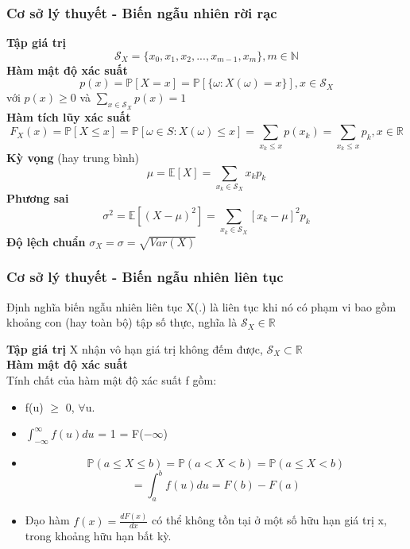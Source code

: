 \documentclass{beamer}
\begin{document}

\begin{frame}[t]
\frametitle{Cơ sở lý thuyết - Biến ngẫu nhiên rời rạc}
\textbf{Tập giá trị} 
\[
\mathcal{S}_X = \{x_0, x_1, x_2, ..., x_{m-1}, x_m\}, m \in \mathbb{N}
\]
\textbf{Hàm mật độ xác suất}\\
\[
p(x) = \mathbb{P}[X=x]= \mathbb{P}[\{\omega: X(\omega)=x\}], x \in \mathcal{S}_X
\]
với $p(x) \geq 0$ và $\sum_{x \in \mathcal{S}_X} p(x) = 1$\\
\textbf{Hàm tích lũy xác suất}
\[
F_{X}(x) = \mathbb{P}[X\leq x] = \mathbb{P}[{\omega \in S: X(\omega) \leq x}]=\sum_{x_k\leq x} p(x_k)
 = \sum_{x_k\leq x} p_k,   x \in \mathbb{R}
\] 
\textbf{Kỳ vọng} (hay trung bình)
\[
\mu = \mathbb{E}[X] = \sum_{x_k \in \mathcal{S}_X} x_k p_k
\]
\textbf{Phương sai}
\[
\sigma^2 = \mathbb{E}[(X-\mu)^2] = \sum_{x_k \in \mathcal{S}_X} [x_k - \mu]^2 p_k
\]
\textbf{Độ lệch chuẩn} $\sigma_{X} = \sigma = \sqrt{Var(X)}$
\end{frame}


\begin{frame}[t]
\frametitle{Cơ sở lý thuyết - Biến ngẫu nhiên liên tục}
\begin{block}{Định nghĩa biến ngẫu nhiên liên tục}
X(.) là liên tục khi nó có phạm vi bao gồm khoảng con (hay toàn bộ) tập số thực, nghĩa là $\mathcal{S}_X \in \mathbb{R}$
\end{block}
\textbf{Tập giá trị} X nhận vô hạn giá trị không đếm được, $\mathcal{S}_X \subset \mathbb{R}$\\
\textbf{Hàm mật độ xác suất}\\
Tính chất của hàm mật độ xác suất f gồm:
\begin{itemize}
\item f(u) $\geq$ 0, $\forall$u.
\item $\int_{-\infty}^{\infty} f(u)du$ = 1 = F($-\infty$)
\item 
\[
\mathbb{P}(a \leq X \leq b) = \mathbb{P}(a < X < b) = \mathbb{P}(a \leq X < b)
\]
\[
 = \int_{a}^{b} f(u)du = F(b) - F(a)
\]
\item Đạo hàm $f(x) = \frac{dF(x)}{dx}$ có thể không tồn tại ở một số hữu hạn giá trị x, trong khoảng hữu hạn bất kỳ.   
\end{itemize}
\end{frame}

\end{document}
